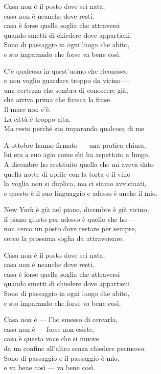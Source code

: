 \begin{lyrics}
Casa non è il posto dove sei nata,\\
casa non è neanche dove resti,\\
casa è forse quella soglia che attraversi\\
quando smetti di chiedere dove appartieni.\\
Sono di passaggio in ogni luogo che abito,\\
e sto imparando che forse va bene così.

C'è qualcosa in quest'uomo che riconosco\\
e non voglio guardare troppo da vicino —\\
una certezza che sembra di conoscere già,\\
che arriva prima che finisca la frase.\\
Il mare non c'è.\\
La città è troppo alta.\\
Ma resto perché sto imparando qualcosa di me.

A ottobre hanno firmato — una pratica chiusa,\\
lui era a suo agio come chi ha aspettato a lungo.\\
A dicembre ho restituito quello che mi aveva dato\\
quella notte di aprile con la torta e il vino —\\
la voglia non si duplica, ma ci siamo avvicinati,\\
e questo è il suo linguaggio e adesso è anche il mio.

New York è già nel piano, dicembre è già vicino,\\
il piano giusto per adesso è quello che ho —\\
non cerco un posto dove restare per sempre,\\
cerco la prossima soglia da attraversare.

Casa non è il posto dove sei nata,\\
casa non è neanche dove resti,\\
casa è forse quella soglia che attraversi\\
quando smetti di chiedere dove appartieni.\\
Sono di passaggio in ogni luogo che abito,\\
e sto imparando che forse va bene così.

Casa non è — l'ho smesso di cercarla,\\
casa non è — forse non esiste,\\
casa è questa voce che si muove\\
da un confine all'altro senza chiedere permesso.\\
Sono di passaggio e il passaggio è mio,\\
e va bene così — va bene così.

\end{lyrics}

